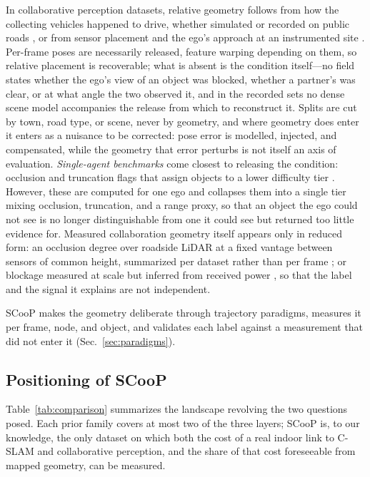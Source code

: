 \documentclass[conference]{IEEEtran}
\begin{document}
In collaborative perception datasets, relative geometry
follows from how the collecting vehicles happened to drive, whether simulated \cite{opv2v} or recorded on public roads \cite{v2v4real}, or from sensor placement and the ego's approach at an instrumented site \cite{dairv2x}. Per-frame poses are necessarily released, feature warping depending on them, so relative placement is recoverable; what is absent is the condition itself---no
field states whether the ego's view of an object was blocked, whether a
partner's was clear, or at what angle the two observed it, and in the recorded sets no dense scene model accompanies the release from which to reconstruct it.
Splits are cut by town, road type, or scene, never by geometry, and where
geometry does enter it enters as a nuisance to be corrected: pose error is
modelled, injected, and compensated, while the geometry that error perturbs is not itself an axis of evaluation. \emph{Single-agent benchmarks} come closest to releasing the condition: occlusion and truncation flags that assign objects to a lower
difficulty tier \cite{kitti}. However, these are computed for one ego and collapses them into a single tier mixing occlusion, truncation, and a range proxy, so that an object the ego could not see is no longer distinguishable from one it could see but returned too little evidence for. Measured collaboration geometry itself appears only in reduced form: an occlusion degree over roadside LiDAR at a fixed vantage
between sensors of common height, summarized per dataset rather than per frame \cite{inscope}; or blockage measured at scale but inferred from received power \cite{deepsense6g}, so that the label and the signal it explains are not independent.

SCooP makes the geometry deliberate through trajectory paradigms, measures it per frame, node, and object, and validates each label against a measurement that did not enter it
(Sec.~\ref{sec:paradigms}).

\subsection{Positioning of SCooP}
Table~\ref{tab:comparison} summarizes the landscape revolving the two questions posed. Each prior family
covers at most two of the three layers; SCooP is, to our knowledge, the only dataset on which both the cost of a real indoor link to C-SLAM and
collaborative perception, and the share of that cost foreseeable from
mapped geometry, can be measured.


\end{document}
